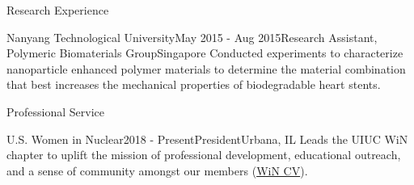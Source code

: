 \documentclass{resume2} %
\begin{document}
\begin{rSection}{Research Experience}
\begin{rSubsection}{Nanyang Technological University}{May 2015 - Aug 2015}{Research Assistant, Polymeric Biomaterials Group}{Singapore}
Conducted experiments to characterize nanoparticle enhanced polymer materials to determine the material 
combination that best increases the mechanical properties of biodegradable heart stents.  
\end{rSubsection}

\end{rSection}

\begin{rSection}{Professional Service}

	\begin{rSubsection}{U.S. Women in Nuclear}{2018 - Present}{President}{Urbana, IL}
	Leads the UIUC WiN chapter to uplift the mission of professional development, 
	educational outreach, and a sense of community amongst our members 
	(\href{https://github.com/gwenchee/wincv}{WiN CV}).
	\end{rSubsection}
	
	\end{rSection}

\end{document}
